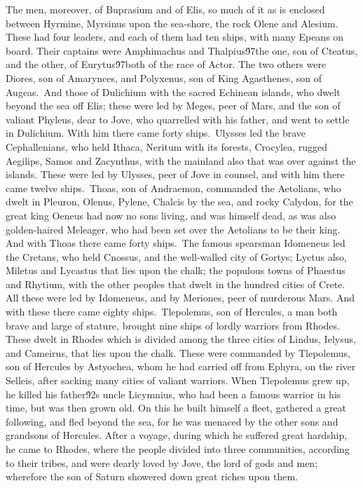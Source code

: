 {The men, moreover, of Buprasium and of Elis, so much of it as is enclosed between Hyrmine, Myrsinus upon the sea-shore, the rock Olene and Alesium. These had four leaders, and each of them had ten ships, with many Epeans on board. Their captains were Amphimachus and Thalpius\'97the one, son of Cteatus, and the other, of Eurytus\'97both of the race of Actor. The two others were Diores, son of Amarynces, and Polyxenus, son of King Agasthenes, son of Augeas.\
And those of Dulichium with the sacred Echinean islands, who dwelt beyond the sea off Elis; these were led by Meges, peer of Mars, and the son of valiant Phyleus, dear to Jove, who quarrelled with his father, and went to settle in Dulichium. With him there came forty ships.\
Ulysses led the brave Cephallenians, who held Ithaca, Neritum with its forests, Crocylea, rugged Aegilips, Samos and Zacynthus, with the mainland also that was over against the islands. These were led by Ulysses, peer of Jove in counsel, and with him there came twelve ships.\
Thoas, son of Andraemon, commanded the Aetolians, who dwelt in Pleuron, Olenus, Pylene, Chalcis by the sea, and rocky Calydon, for the great king Oeneus had now no sons living, and was himself dead, as was also golden-haired Meleager, who had been set over the Aetolians to be their king. And with Thoas there came forty ships.\
The famous spearsman Idomeneus led the Cretans, who held Cnossus, and the well-walled city of Gortys; Lyctus also, Miletus and Lycastus that lies upon the chalk; the populous towns of Phaestus and Rhytium, with the other peoples that dwelt in the hundred cities of Crete. All these were led by Idomeneus, and by Meriones, peer of murderous Mars. And with these there came eighty ships.\
Tlepolemus, son of Hercules, a man both brave and large of stature, brought nine ships of lordly warriors from Rhodes. These dwelt in Rhodes which is divided among the three cities of Lindus, Ielysus, and Cameirus, that lies upon the chalk. These were commanded by Tlepolemus, son of Hercules by Astyochea, whom he had carried off from Ephyra, on the river Selleis, after sacking many cities of valiant warriors. When Tlepolemus grew up, he killed his father\'92s uncle Licymnius, who had been a famous warrior in his time, but was then grown old. On this he built himself a fleet, gathered a great following, and fled beyond the sea, for he was menaced by the other sons and grandsons of Hercules. After a voyage, during which he suffered great hardship, he came to Rhodes, where the people divided into three communities, according to their tribes, and were dearly loved by Jove, the lord of gods and men; wherefore the son of Saturn showered down great riches upon them.\
}
